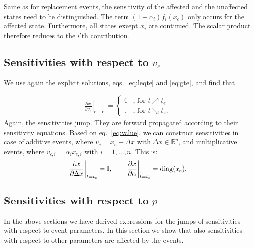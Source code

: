 \documentclass[journal, a4paper]{IEEEtran}
\begin{document}
Same as for replacement events, the sensitivity of the affected and
the unaffected states need to be distinguished. The term
$(1-\alpha_i)f_i(x_e)$ only occurs for the affected state. Furthermore,
all states except $x_i$ are continued. The scalar product therefore
reduces to the $i$'th contribution.


\subsection{Sensitivities with respect to $v_e$}


We use again the explicit solutions, eqs.~\eqref{eq:leqte} and
\eqref{eq:gte}, and find that

\begin{align}
    \left.\frac{\partial x}{\partial v_e}\right|_{t = t_e} =
    \left\{
    \begin{array}{ll}
    0     & \textrm{, for } t\nearrow t_e \\
    \mathbb I     & \textrm{, for }t \searrow t_e.
    \end{array}
    \right.
    \label{eq:value}
\end{align}
Again, the sensitivities jump. They are forward propagated according to their sensitivity equations. Based on eq.~\eqref{eq:value}, we can construct sensitivities in case of additive events, where $v_e = x_e + \Delta x$ with $\Delta x \in \mathbb R^n$, and multiplicative events, where $v_{e, i} = \alpha_i x_{e, i}$ with $i = 1, \dots, n$. This is:
\begin{align}
    \left.\frac{\partial x}{\partial \Delta x}\right|_{t = t_e} = \mathbb I, \qquad \left.\frac{\partial x}{\partial \alpha}\right|_{t = t_e} = {\rm diag}(x_e).
\end{align}

\subsection{Sensitivities with respect to $p$}


In the above sections we have derived expressions for the jumps of sensitivities with respect to event parameters. In this section we show that also sensitivities with respect to other parameters are affected by the events.
\end{document}
